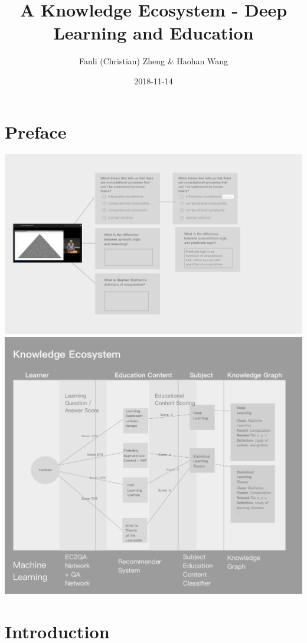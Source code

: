 \documentclass[]{book}
\title{A Knowledge Ecosystem - Deep Learning and Education}
\author{Fanli (Christian) Zheng \& Haohan Wang}
\date{2018-11-14}
\theoremstyle{definition}
\theoremstyle{definition}
\theoremstyle{definition}
\theoremstyle{remark}
\begin{document}
\maketitle

{
\hypersetup{linkcolor=black}
\setcounter{tocdepth}{1}
\tableofcontents
}
\chapter*{Preface}\label{preface}

\includegraphics{img/MtoQA.png}
\includegraphics{img/knowledgeEcosystem.png}

\chapter{Introduction}\label{introduction}
\end{document}
